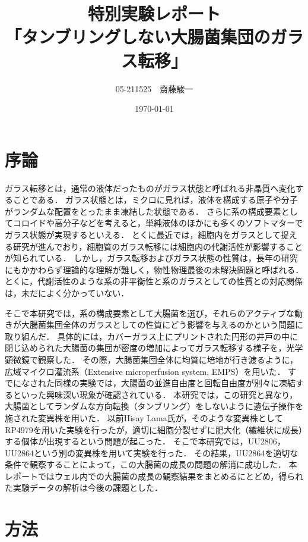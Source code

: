 \documentclass[a4paper,11pt,titlepage]{jsarticle}
\begin{document}
\title{特別実験レポート\\「タンブリングしない大腸菌集団のガラス転移」}
\author{05-211525　齋藤駿一}
\date{\today}
\maketitle

\section{序論}

ガラス転移とは，通常の液体だったものがガラス状態と呼ばれる非晶質へ変化することである．
ガラス状態とは，ミクロに見れば，液体を構成する原子や分子がランダムな配置をとったまま凍結した状態である．
さらに系の構成要素としてコロイドや高分子などを考えると，単純液体のほかにも多くのソフトマターでガラス状態が実現するといえる\cite{glass}．
とくに最近では，細胞内をガラスとして捉える研究が進んでおり，細胞質のガラス転移には細胞内の代謝活性が影響することが知られている\cite{cyto1}\cite{cyto2}．
しかし，ガラス転移およびガラス状態の性質は，長年の研究にもかかわらず理論的な理解が難しく，物性物理最後の未解決問題と呼ばれる．
とくに，代謝活性のような系の非平衡性と系のガラスとしての性質との対応関係は，未だによく分かっていない．

そこで本研究では，系の構成要素として大腸菌を選び，それらのアクティブな動きが大腸菌集団全体のガラスとしての性質にどう影響を与えるのかという問題に取り組んだ．
具体的には，カバーガラス上にプリントされた円形の井戸の中に閉じ込められた大腸菌の集団が密度の増加によってガラス転移する様子を，光学顕微鏡で観察した．
その際，大腸菌集団全体に均質に培地が行き渡るように，広域マイクロ灌流系（Extensive microperfusion system, EMPS）を用いた．
すでになされた同様の実験では，大腸菌の並進自由度と回転自由度が別々に凍結するといった興味深い現象が確認されている\cite{lama}．
本研究では，この研究と異なり，大腸菌としてランダムな方向転換（タンブリング）をしないように遺伝子操作を施された変異株を用いた．
以前Hisay Lama氏が，そのような変異株としてRP4979を用いた実験を行ったが，適切に細胞分裂せずに肥大化（繊維状に成長）する個体が出現するという問題が起こった．
そこで本研究では，UU2806，UU2864という別の変異株を用いて実験を行った．
その結果，UU2864を適切な条件で観察することによって，この大腸菌の成長の問題の解消に成功した．
本レポートではウェル内での大腸菌の成長の観察結果をまとめるにとどめ，得られた実験データの解析は今後の課題とした．

\section{方法}
\end{document}
